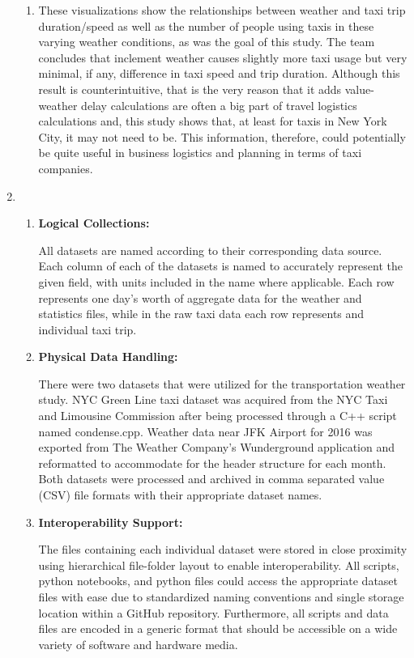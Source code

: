 \documentclass{article}
\begin{document}
\begin{enumerate}
\begin{enumerate}
        \item %
        These visualizations show the relationships between weather and taxi trip duration/speed as well as the number of people using taxis in these varying weather conditions, as was the goal of this study. The team concludes that inclement weather causes slightly more taxi usage but very minimal, if any, difference in taxi speed and trip duration. Although this result is counterintuitive, that is the very reason that it adds value- weather delay calculations are often a big part of travel logistics calculations and, this study shows that, at least for taxis in New York City, it may not need to be. This information, therefore, could potentially be quite useful in business logistics and planning in terms of taxi companies.


    \end{enumerate}

    \item %

    \begin{enumerate}

        \item
        \textbf{Logical Collections:}

        All datasets are named according to their corresponding data source. Each column of each of the datasets is named to accurately represent the given field, with units included in the name where applicable. Each row represents one day's worth of aggregate data for the weather and statistics files, while in the raw taxi data each row represents and individual taxi trip.


        \item
        \textbf{Physical Data Handling:}

        There were two datasets that were utilized for the transportation weather study. NYC Green Line taxi dataset was acquired from the NYC Taxi and Limousine Commission after being processed through a C++ script named condense.cpp. Weather data near JFK Airport for 2016 was exported from The Weather Company’s Wunderground application and reformatted to accommodate for the header structure for each month. Both datasets were processed and archived in comma separated value (CSV) file formats with their appropriate dataset names.


        \item
        \textbf{Interoperability Support:}

        The files containing each individual dataset were stored in close proximity using hierarchical file-folder layout to enable interoperability. All scripts, python notebooks, and python files could access the appropriate dataset files with ease due to standardized naming conventions and single storage location within a GitHub repository. Furthermore, all scripts and data files are encoded in a generic format that should be accessible on a wide variety of software and hardware media.



\end{enumerate}
\end{enumerate}
\end{document}
